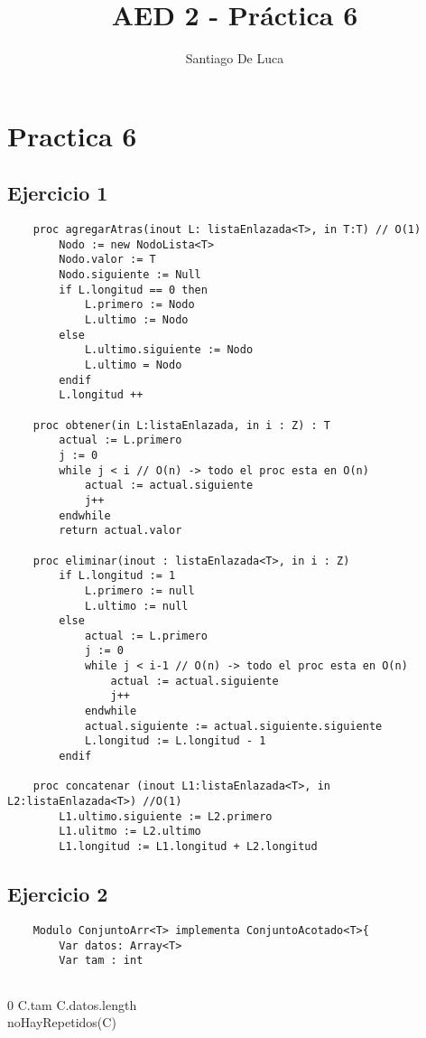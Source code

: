 \documentclass[10pt,a4paper]{article}
\begin{document}
\title{AED 2 - Práctica 6}
\author{Santiago De Luca}

\maketitle

\section{Practica 6}
\subsection{Ejercicio 1}


\begin{lstlisting}
	proc agregarAtras(inout L: listaEnlazada<T>, in T:T) // O(1)
		Nodo := new NodoLista<T>
		Nodo.valor := T
		Nodo.siguiente := Null
		if L.longitud == 0 then
			L.primero := Nodo
			L.ultimo := Nodo
		else 
			L.ultimo.siguiente := Nodo
			L.ultimo = Nodo
		endif
		L.longitud ++

	proc obtener(in L:listaEnlazada, in i : Z) : T
		actual := L.primero
		j := 0
		while j < i // O(n) -> todo el proc esta en O(n)
			actual := actual.siguiente
			j++
		endwhile
		return actual.valor

	proc eliminar(inout : listaEnlazada<T>, in i : Z)
		if L.longitud := 1
			L.primero := null
			L.ultimo := null
		else
			actual := L.primero
			j := 0
			while j < i-1 // O(n) -> todo el proc esta en O(n)
				actual := actual.siguiente
				j++
			endwhile
			actual.siguiente := actual.siguiente.siguiente
			L.longitud := L.longitud - 1
		endif

	proc concatenar (inout L1:listaEnlazada<T>, in L2:listaEnlazada<T>) //O(1)
		L1.ultimo.siguiente := L2.primero
		L1.ulitmo := L2.ultimo
		L1.longitud := L1.longitud + L2.longitud
\end{lstlisting}

\subsection{Ejercicio 2}

\begin{lstlisting}
	Modulo ConjuntoArr<T> implementa ConjuntoAcotado<T>{
		Var datos: Array<T>
		Var tam : int
		
\end{lstlisting}

{0 \le C.tam \le C.datos.length \\
\land noHayRepetidos(C)}
\end{document}
